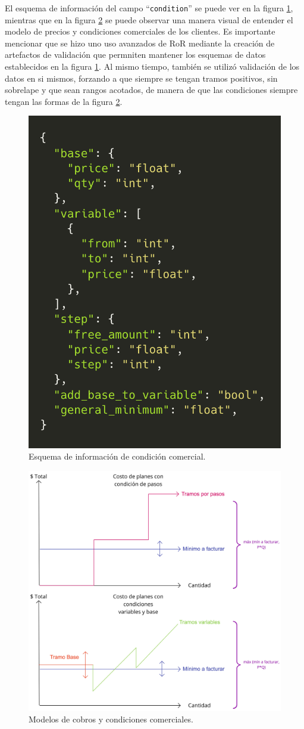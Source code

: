     El esquema de información del campo ``\texttt{condition}'' se puede ver en la figura \ref{fig:cc_condition_schema}, mientras que en la figura \ref{fig:cc_pricing_chart} se puede observar una manera visual de entender el modelo de precios y condiciones comerciales de los clientes. Es importante mencionar que se hizo uno uso avanzados de RoR mediante la creación de artefactos de validación que permniten mantener los esquemas de datos establecidos en la figura \ref{fig:cc_condition_schema}. Al mismo tiempo, también se utilizó validación de los datos en si mismos, forzando a que siempre se tengan tramos positivos, sin sobrelape y que sean rangos acotados, de manera de que las condiciones siempre tengan las formas de la figura \ref{fig:cc_pricing_chart}.
    
    \begin{figure}
      \centering
      \includegraphics[width=0.4\linewidth]{figures/cc/cc_condition_schema.png}
      \caption{Esquema de información de condición comercial.}
      \label{fig:cc_condition_schema}
    \end{figure}

    \begin{figure}
      \centering
      \includegraphics[width=0.6\linewidth]{figures/cc/cc_pricing_chart.jpg}
      \caption{Modelos de cobros y condiciones comerciales.}
      \label{fig:cc_pricing_chart}
    \end{figure}

